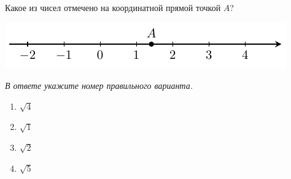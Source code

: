 Какое из чисел отмечено на координатной прямой точкой $A$?
\begin{center}
	\includegraphics[align=t,]{graphs/graph_5/graph_5}
\end{center}

\textit{В ответе укажите номер правильного варианта.}
\begin{multicols}{4}
	\begin{enumerate}[label=\arabic*)]
		\item $\sqrt{4}$
		\item $\sqrt{1}$
		\item $\sqrt{2}$
		\item $\sqrt{5}$
	\end{enumerate}
\end{multicols}